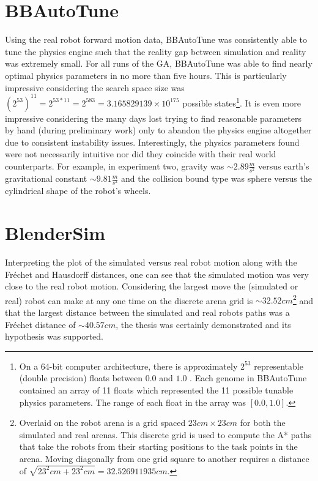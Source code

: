 \section{BBAutoTune}

Using the real robot forward motion data, BBAutoTune was consistently able to tune the physics engine such that the reality gap between simulation and reality was extremely small. For all runs of the GA, BBAutoTune was able to find nearly optimal physics parameters in no more than five hours. This is particularly impressive considering the search space size was $(2^{53})^{11}=2^{53*11}=2^{583}=3.165829139\times10^{175}$ possible states\footnote{On a 64-bit computer architecture, there is approximately $2^{53}$ representable (double precision) floats between $0.0$ and $1.0$ \cite{Patterson:2013:COD:2568134}\cite{PythonFloat}. Each genome in BBAutoTune contained an array of 11 floats which represented the 11 possible tunable physics parameters. The range of each float in the array was $[0.0,1.0]$.}. It is even more impressive considering the many days lost trying to find reasonable parameters by hand (during preliminary work) only to abandon the physics engine altogether due to consistent instability issues. Interestingly, the physics parameters found were not necessarily intuitive nor did they coincide with their real world counterparts. For example, in experiment two, gravity was $\sim2.89\frac{m}{s^2}$ versus earth's gravitational constant $\sim9.81\frac{m}{s^2}$ and the collision bound type was sphere versus the cylindrical shape of the robot's wheels.   

\section{BlenderSim}

Interpreting the plot of the simulated versus real robot motion along with the Fr{\'e}chet and Hausdorff distances, one can see that the simulated motion was very close to the real robot motion. Considering the largest move the (simulated or real) robot can make at any one time on the discrete arena grid is $\sim32.52cm$\footnote{Overlaid on the robot arena is a grid spaced $23cm\times23cm$ for both the simulated and real arenas. This discrete grid is used to compute the A* paths that take the robots from their starting positions to the task points in the arena. Moving diagonally from one grid square to another requires a distance of $\sqrt{23^2cm+23^2cm}=32.526911935cm$.} and that the largest distance between the simulated and real robots paths was a Fr{\'e}chet distance of $\sim40.57cm$, the thesis was certainly demonstrated and its hypothesis was supported.

